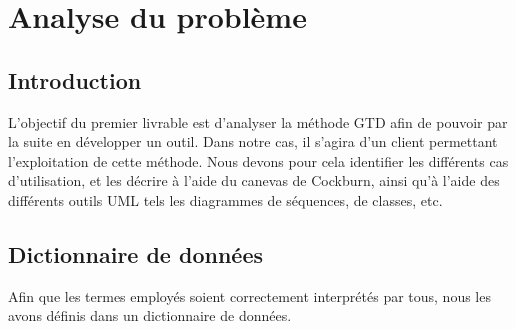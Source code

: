 \chapter{Analyse du problème}
\setcounter{minitocdepth}{2}
\minitoc

\section{Introduction}
L'objectif du premier livrable est d'analyser la méthode GTD afin de pouvoir par la suite en développer un outil. Dans notre cas, il s'agira d'un client permettant l'exploitation de cette méthode. Nous devons pour cela identifier les différents cas d'utilisation, et les décrire à l'aide du canevas de Cockburn, ainsi qu'à l'aide des différents outils UML tels les diagrammes de séquences, de classes, etc.

\section{Dictionnaire de données}
Afin que les termes employés soient correctement interprétés par tous, nous les avons définis dans un dictionnaire de données.

